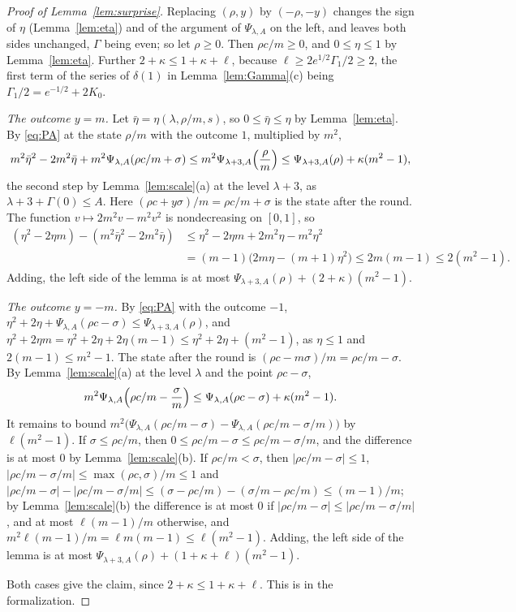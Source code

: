 \documentclass[12pt]{amsart}
\theoremstyle{definition}
\numberwithin{equation}{section}
\begin{document}
\begin{proof}[Proof of Lemma~\ref{lem:surprise}]
Replacing $(\rho,y)$ by $(-\rho,-y)$ changes the sign of $\eta$ (Lemma~\ref{lem:eta}) and of the argument of $\Psi_{\lambda,A}$ on the left, and leaves both sides unchanged, $\Gamma$ being even; so let $\rho\ge0$. Then $\rho c/m\ge0$, and $0\le\eta\le1$ by Lemma~\ref{lem:eta}. Further $2+\kappa\le1+\kappa+\ell$, because $\ell\ge2e^{1/2}\Gamma_1/2\ge2$, the first term of the series of $\delta(1)$ in Lemma~\ref{lem:Gamma}(c) being $\Gamma_1/2=e^{-1/2}+2K_0$.

\emph{The outcome $y=m$.} Let $\bar\eta=\eta(\lambda,\rho/m,s)$, so $0\le\bar\eta\le\eta$ by Lemma~\ref{lem:eta}. By \eqref{eq:PA} at the state $\rho/m$ with the outcome $1$, multiplied by $m^2$,
\[
m^2\bar\eta^2-2m^2\bar\eta+m^2\Psi_{\lambda,A}(\rho c/m+\sigma)\le m^2\Psi_{\lambda+3,A}\Bigl(\frac\rho m\Bigr)\le\Psi_{\lambda+3,A}(\rho)+\kappa(m^2-1),
\]
the second step by Lemma~\ref{lem:scale}(a) at the level $\lambda+3$, as $\lambda+3+\Gamma(0)\le A$. Here $(\rho c+y\sigma)/m=\rho c/m+\sigma$ is the state after the round. The function $v\mapsto2m^2v-m^2v^2$ is nondecreasing on $[0,1]$, so
\begin{align*}
(\eta^2-2\eta m)-(m^2\bar\eta^2-2m^2\bar\eta)&\leq\eta^2-2\eta m+2m^2\eta-m^2\eta^2\\
&=(m-1)\bigl(2m\eta-(m+1)\eta^2\bigr)\leq2m(m-1)\leq2(m^2-1).
\end{align*}
Adding, the left side of the lemma is at most $\Psi_{\lambda+3,A}(\rho)+(2+\kappa)(m^2-1)$.

\emph{The outcome $y=-m$.} By \eqref{eq:PA} with the outcome $-1$, $\eta^2+2\eta+\Psi_{\lambda,A}(\rho c-\sigma)\le\Psi_{\lambda+3,A}(\rho)$, and $\eta^2+2\eta m=\eta^2+2\eta+2\eta(m-1)\le\eta^2+2\eta+(m^2-1)$, as $\eta\le1$ and $2(m-1)\le m^2-1$. The state after the round is $(\rho c-m\sigma)/m=\rho c/m-\sigma$. By Lemma~\ref{lem:scale}(a) at the level $\lambda$ and the point $\rho c-\sigma$,
\[
m^2\Psi_{\lambda,A}\Bigl(\rho c/m-\frac\sigma m\Bigr)\le\Psi_{\lambda,A}(\rho c-\sigma)+\kappa(m^2-1).
\]
It remains to bound $m^2\bigl(\Psi_{\lambda,A}(\rho c/m-\sigma)-\Psi_{\lambda,A}(\rho c/m-\sigma/m)\bigr)$ by $\ell(m^2-1)$. If $\sigma\le\rho c/m$, then $0\le\rho c/m-\sigma\le\rho c/m-\sigma/m$, and the difference is at most $0$ by Lemma~\ref{lem:scale}(b). If $\rho c/m<\sigma$, then $|\rho c/m-\sigma|\le1$, $|\rho c/m-\sigma/m|\le\max(\rho c,\sigma)/m\le1$ and $|\rho c/m-\sigma|-|\rho c/m-\sigma/m|\le(\sigma-\rho c/m)-(\sigma/m-\rho c/m)\le(m-1)/m$; by Lemma~\ref{lem:scale}(b) the difference is at most $0$ if $|\rho c/m-\sigma|\le|\rho c/m-\sigma/m|$, and at most $\ell(m-1)/m$ otherwise, and $m^2\ell(m-1)/m=\ell m(m-1)\le\ell(m^2-1)$. Adding, the left side of the lemma is at most $\Psi_{\lambda+3,A}(\rho)+(1+\kappa+\ell)(m^2-1)$.

Both cases give the claim, since $2+\kappa\le1+\kappa+\ell$. This is  in the formalization.
\end{proof}
\end{document}
